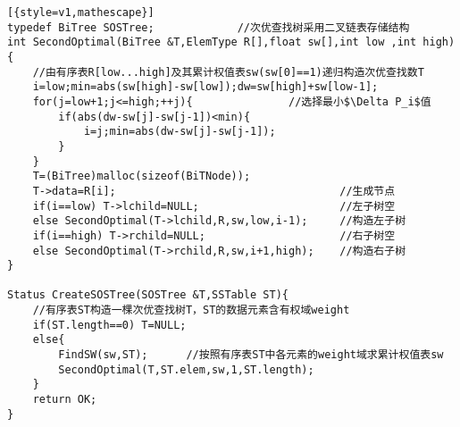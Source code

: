 \documentclass[UTF8]{ctexart}
\begin{document}
 



\begin{lstlisting}[{style=v1,mathescape}]
typedef BiTree SOSTree;             //次优查找树采用二叉链表存储结构
int SecondOptimal(BiTree &T,ElemType R[],float sw[],int low ,int high){
    //由有序表R[low...high]及其累计权值表sw(sw[0]==1)递归构造次优查找数T
    i=low;min=abs(sw[high]-sw[low]);dw=sw[high]+sw[low-1];
    for(j=low+1;j<=high;++j){               //选择最小$\Delta P_i$值
        if(abs(dw-sw[j]-sw[j-1])<min){
            i=j;min=abs(dw-sw[j]-sw[j-1]);
        }
    }
    T=(BiTree)malloc(sizeof(BiTNode));
    T->data=R[i];                                   //生成节点
    if(i==low) T->lchild=NULL;                      //左子树空
    else SecondOptimal(T->lchild,R,sw,low,i-1);     //构造左子树   
    if(i==high) T->rchild=NULL;                     //右子树空
    else SecondOptimal(T->rchild,R,sw,i+1,high);    //构造右子树    
}

Status CreateSOSTree(SOSTree &T,SSTable ST){
    //有序表ST构造一棵次优查找树T，ST的数据元素含有权域weight
    if(ST.length==0) T=NULL;
    else{
        FindSW(sw,ST);      //按照有序表ST中各元素的weight域求累计权值表sw
        SecondOptimal(T,ST.elem,sw,1,ST.length);
    }
    return OK;
}

\end{lstlisting}
\end{document}

